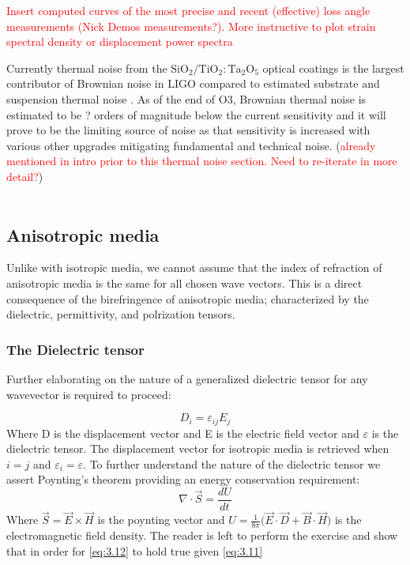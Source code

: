 \textcolor{red}{Insert computed curves of the most precise and recent (effective) loss angle measurements (Nick Demos measurements?). More instructive to plot strain spectral density or displacement power spectra}

\noindent Currently thermal noise from the $\mathrm{SiO_2}/\mathrm{TiO_2:Ta_2O_5}$ optical coatings is the largest contributor of Brownian noise in LIGO compared to estimated substrate and suspension thermal noise \cite{Harry:06}. As of the end of O3, Brownian thermal noise is estimated to be ? orders of magnitude below the current sensitivity and it will prove to be the limiting source of noise as that sensitivity is increased with various other upgrades mitigating fundamental and technical noise. (\textcolor{red}{already mentioned in intro prior to this thermal noise section. Need to re-iterate in more detail?})
\\
\\
\subsection{Anisotropic media}
Unlike with isotropic media, we cannot assume that the index of refraction of anisotropic media is the same for all chosen wave vectors. This is a direct consequence of the birefringence of anisotropic media; characterized by the dielectric, permittivity, and polrization tensors.

\subsubsection{The Dielectric tensor}
Further elaborating on the nature of a generalized dielectric tensor for any wavevector is required to proceed:

\begin{equation}\label{eq:3.11}
D_i = \varepsilon_{ij}E_j
\end{equation}
Where D is the displacement vector and E is the electric field vector and $\varepsilon$ is the dielectric tensor. The displacement vector for isotropic media is retrieved when $i = j$ and $\varepsilon_i = \varepsilon$. To further understand the nature of the dielectric tensor we assert Poynting's theorem providing an energy conservation requirement:
\begin{equation}\label{eq:3.12}
\nabla \cdot \vec{S} = \frac{dU}{dt}
\end{equation}
Where $\vec{S} = \vec{E} \times \vec{H}$ is the poynting vector and $U = \frac{1}{8 \pi} \big( \vec{E} \cdot \vec{D} + \vec{B} \cdot \vec{H} \big)$ is the electromagnetic field density. The reader is left to perform the exercise and show that in order for \ref{eq:3.12} to hold true given \ref{eq:3.11}

